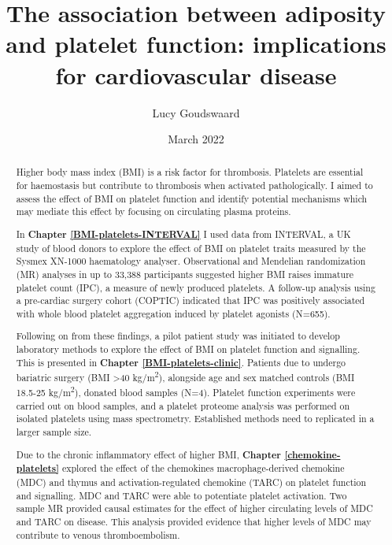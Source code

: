 \documentclass[11pt,twoside]{bristolthesis}
\title{The association between adiposity and platelet function: implications for cardiovascular disease}
\author{Lucy Goudswaard}
\date{March 2022}
\begin{document}
  \maketitle

\frontmatter %
\pagestyle{empty} %
\begingroup
  \begin{abstract}
    Higher body mass index (BMI) is a risk factor for thrombosis. Platelets are essential for haemostasis but contribute to thrombosis when activated pathologically. I aimed to assess the effect of BMI on platelet function and identify potential mechanisms which may mediate this effect by focusing on circulating plasma proteins.

    In \textbf{Chapter \ref{BMI-platelets-INTERVAL}} I used data from INTERVAL, a UK study of blood donors to explore the effect of BMI on platelet traits measured by the Sysmex XN-1000 haematology analyser. Observational and Mendelian randomization (MR) analyses in up to 33,388 participants suggested higher BMI raises immature platelet count (IPC), a measure of newly produced platelets. A follow-up analysis using a pre-cardiac surgery cohort (COPTIC) indicated that IPC was positively associated with whole blood platelet aggregation induced by platelet agonists (N=655).

    Following on from these findings, a pilot patient study was initiated to develop laboratory methods to explore the effect of BMI on platelet function and signalling. This is presented in \textbf{Chapter \ref{BMI-platelets-clinic}}. Patients due to undergo bariatric surgery (BMI \textgreater40 kg/m\textsuperscript{2}), alongside age and sex matched controls (BMI 18.5-25 kg/m\textsuperscript{2}), donated blood samples (N=4). Platelet function experiments were carried out on blood samples, and a platelet proteome analysis was performed on isolated platelets using mass spectrometry. Established methods need to replicated in a larger sample size.

    Due to the chronic inflammatory effect of higher BMI, \textbf{Chapter \ref{chemokine-platelets}} explored the effect of the chemokines macrophage-derived chemokine (MDC) and thymus and activation-regulated chemokine (TARC) on platelet function and signalling. MDC and TARC were able to potentiate platelet activation. Two sample MR provided causal estimates for the effect of higher circulating levels of MDC and TARC on disease. This analysis provided evidence that higher levels of MDC may contribute to venous thromboembolism.


\end{abstract}
\end{document}
